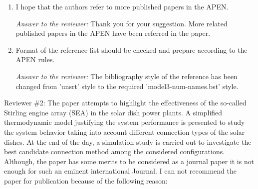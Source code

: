 \documentclass[12pt]{letter}
\begin{document}
\begin{enumerate}
\item I hope that the authors refer to more published papers in the APEN.

\begin{snugshade*}
\emph{Answer to the reviewer:} Thank you for your suggestion. More related published papers in the APEN have been referred in the paper.
\end{snugshade*}

\item Format of the reference list should be checked and prepare according to the APEN rules.

\begin{snugshade*}
\emph{Answer to the reviewer:} The bibliography style of the reference has been changed from 'unsrt' style to the required 'model3-num-names.bst' style.
\end{snugshade*}

\end{enumerate}

\newpage
Reviewer \#2:  The paper attempts to highlight the effectiveness of the so-called Stirling engine array (SEA) in the solar dish power plants. A simplified thermodynamic model justifying the system performance is presented to study the system behavior taking into account different connection types of the solar dishes. At the end of the day, a simulation study is carried out to investigate the best candidate connection method among the considered configurations. Although, the paper has some merits to be considered as a journal paper it is not enough for such an eminent international Journal. I can not recommend the paper for publication because of the following reason:
\end{document}

